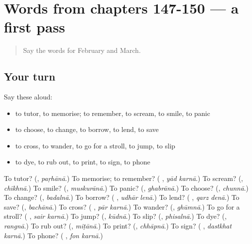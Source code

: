 \section[(dialogue)]{Words from chapters 147-150 — a first pass}

\label{lesson:UR-R155-first-pass-words-from-chapters-147-150}



\begin{quote}
Say the words for February and March.
\end{quote}

\subsection*{Your turn}
Say these aloud:

\begin{itemize}
\raggedright
  \item to tutor, to memorise; to remember, to scream, to smile, to panic
  \item to choose, to change, to borrow, to lend, to save
  \item to cross, to wander, to go for a stroll, to jump, to slip
  \item to dye, to rub out, to print, to sign, to phone
\end{itemize}

\begin{tcolorbox}[breakable,colback=teal!4,colframe=teal!35!black,title={Before you move on}]
To tutor? (\textbf{}, \emph{paṛhānā}.) To memorise; to remember? (\textbf{ }, \emph{yād karnā}.) To scream? (\textbf{}, \emph{chīkhnā}.) To smile? (\textbf{}, \emph{muskurānā}.) To panic? (\textbf{}, \emph{ghabrānā}.) To choose? (\textbf{}, \emph{chunnā}.) To change? (\textbf{}, \emph{badalnā}.) To borrow? (\textbf{ }, \emph{udhār lenā}.) To lend? (\textbf{ }, \emph{qarz denā}.) To save? (\textbf{}, \emph{bachānā}.) To cross? (\textbf{ }, \emph{pār karnā}.) To wander? (\textbf{}, \emph{ghūmnā}.) To go for a stroll? (\textbf{ }, \emph{sair karnā}.) To jump? (\textbf{}, \emph{kūdnā}.) To slip? (\textbf{}, \emph{phisalnā}.) To dye? (\textbf{}, \emph{rangnā}.) To rub out? (\textbf{}, \emph{miṭānā}.) To print? (\textbf{}, \emph{chhāpnā}.) To sign? (\textbf{ }, \emph{dastkhat karnā}.) To phone? (\textbf{ }, \emph{fon karnā}.)
\end{tcolorbox}
